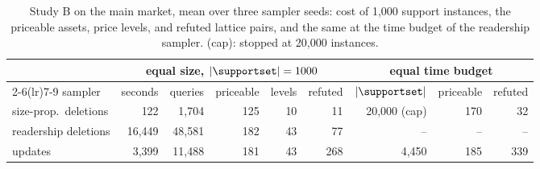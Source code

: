 
\begin{table}[t]
  \centering
  \small
  \caption{Study B on the main market, mean over three sampler seeds: cost of 1,000 support instances, the priceable assets, price levels, and refuted lattice pairs, and the same at the time budget of the readership sampler. (cap): stopped at 20,000 instances.}
  \label{tab:sampling}
  \begin{tabular}{@{}lrrrrrrrr@{}}
    \toprule
    & \multicolumn{5}{c}{equal size, $|\supportset| = 1000$} & \multicolumn{3}{c}{equal time budget} \\
    \cmidrule(lr){2-6}\cmidrule(lr){7-9}
    sampler & seconds & queries & priceable & levels & refuted & $|\supportset|$ & priceable & refuted \\
    \midrule
    size-prop.\ deletions & 122 & 1,704 & 125 & 10 & 11 & 20,000 (cap) & 170 & 32 \\
    readership deletions & 16,449 & 48,581 & 182 & 43 & 77 & -- & -- & -- \\
    \qirana{} updates & 3,399 & 11,488 & 181 & 43 & 268 & 4,450 & 185 & 339 \\
    \bottomrule
  \end{tabular}
\end{table}
